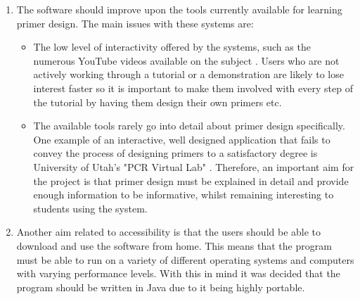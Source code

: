 \begin {enumerate}
\item The software should improve upon the tools currently available
  for learning primer design. The main issues with these systems are: 

\begin {itemize}
\item The low level of interactivity offered by the systems, such as
  the numerous YouTube videos available on the subject
  \cite{youtube:taqExtension}. Users who are not actively working
  through a tutorial or a demonstration are likely to lose interest
  faster so it is important to make them involved with every step of
  the tutorial by having them design their own primers etc.
\item The available tools rarely go into detail about primer design
  specifically. One example of an interactive, well designed
  application that fails to convey the process of designing primers to
  a satisfactory degree is University of Utah's "PCR Virtual Lab"
  \cite{genScienceCenter2012}. Therefore, an important aim for the
  project is that primer design must be explained in detail and
  provide enough information to be informative, whilst remaining
  interesting to students using the system.
\end {itemize}

\item Another aim related to accessibility is that the users should be
  able to download and use the software from home. This means that the
  program must be able to run on a variety of different operating
  systems and computers with varying performance levels. With this in
  mind it was decided that the program should be written in Java due
  to it being highly portable.
\end {enumerate}
